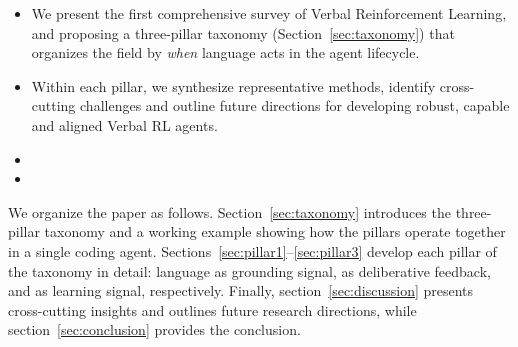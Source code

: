 \begin{itemize}

    \item We present the first comprehensive survey of Verbal Reinforcement Learning,  and proposing a three-pillar taxonomy (Section~\ref{sec:taxonomy}) that organizes the field by \emph{when} language acts in the agent lifecycle.
    \item Within each pillar, we synthesize representative methods, identify cross-cutting challenges and outline future directions for developing robust, capable and aligned Verbal RL agents.
    \item {}
    \item {}



\end{itemize}

We organize the paper as follows. Section~\ref{sec:taxonomy} introduces the three-pillar taxonomy and a working example showing how the pillars operate together in a single coding agent. Sections~\ref{sec:pillar1}--\ref{sec:pillar3} develop each pillar of the taxonomy in detail: language as grounding signal, as deliberative feedback, and as learning signal, respectively. Finally, section~\ref{sec:discussion} presents cross-cutting insights and outlines future research directions, while section~\ref{sec:conclusion} provides the conclusion.


